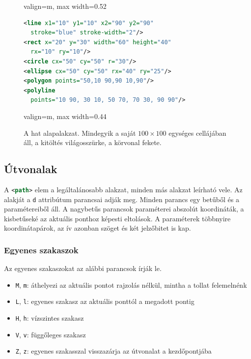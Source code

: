 \begin{figure}[!ht]
    \centering
    \begin{adjustbox}{valign=m, max width=0.52\textwidth}
        \begin{lstlisting}[language=XML]
<line x1="10" y1="10" x2="90" y2="90"
  stroke="blue" stroke-width="2"/>
<rect x="20" y="30" width="60" height="40"
  rx="10" ry="10"/>
<circle cx="50" cy="50" r="30"/>
<ellipse cx="50" cy="50" rx="40" ry="25"/>
<polygon points="50,10 90,90 10,90"/>
<polyline
  points="10 90, 30 10, 50 70, 70 30, 90 90"/>
        \end{lstlisting}
    \end{adjustbox}
    \hfill
    \begin{adjustbox}{valign=m, max width=0.44\textwidth}
        
    \end{adjustbox}
    \caption{A hat alapalakzat. Mindegyik a saját $100\times100$ egységes cellájában áll, a kitöltés világosszürke, a körvonal fekete.}
    \label{fig:basic-shapes}
\end{figure}

\subsection{Útvonalak}
\label{sub:paths}

A \lstinline[language=XML]|<path>| elem a legáltalánosabb alakzat, minden más alakzat leírható vele. Az alakját a \texttt{d} attribútum parancsai adják meg. Minden parancs egy betűből és a paramétereiből áll. A nagybetűs parancsok paraméterei abszolút koordináták, a kisbetűseké az aktuális ponthoz képesti eltolások. A paraméterek többnyire koordinátapárok, az ív azonban szöget és két jelzőbitet is kap.

\subsubsection{Egyenes szakaszok}

Az egyenes szakaszokat az alábbi parancsok írják le.

\begin{itemize}
\item \texttt{M}, \texttt{m}: áthelyezi az aktuális pontot rajzolás nélkül, mintha a tollat felemelnénk
\item \texttt{L}, \texttt{l}: egyenes szakasz az aktuális ponttól a megadott pontig
\item \texttt{H}, \texttt{h}: vízszintes szakasz
\item \texttt{V}, \texttt{v}: függőleges szakasz
\item \texttt{Z}, \texttt{z}: egyenes szakasszal visszazárja az útvonalat a kezdőpontjába
\end{itemize}

